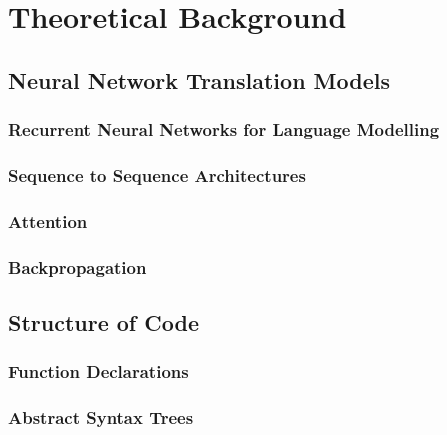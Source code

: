 \chapter{Theoretical Background}
\label{theoreticalbackground}


\section{Neural Network Translation Models} %
\label{sec:lstm}

\subsection{Recurrent Neural Networks for Language Modelling} %
\label{sub:recurrent_neural_networks}

\subsection{Sequence to Sequence Architectures} %
\label{sub:sequence_to_sequence_architectures}

\subsection{Attention} %
\label{sub:attention}

\subsection{Backpropagation} %
\label{sub:backpropagation}

\blindtext

\section{Structure of Code} %
\label{sec:translating_code}

\subsection{Function Declarations} %
\label{sub:function_declarations}

\subsection{Abstract Syntax Trees} %
\label{sub:abstract_syntax_trees}



\blindtext
